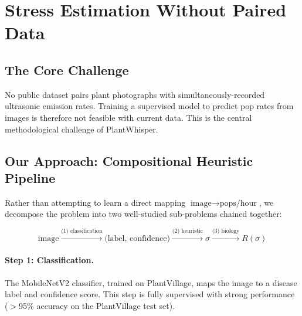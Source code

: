 \documentclass[11pt,a4paper,twocolumn]{article}
\begin{document}
\section{Stress Estimation Without Paired Data}
\label{sec:stress_mapping}

\subsection{The Core Challenge}

No public dataset pairs plant photographs with simultaneously-recorded ultrasonic emission rates. Training a supervised model to predict pop rates from images is therefore not feasible with current data. This is the central methodological challenge of PlantWhisper.

\subsection{Our Approach: Compositional Heuristic Pipeline}

Rather than attempting to learn a direct mapping $\text{image} \to \text{pops/hour}$, we decompose the problem into two well-studied sub-problems chained together:

\begin{equation}
    \text{image} \xrightarrow{\text{(1) classification}} \text{(label, confidence)} \xrightarrow{\text{(2) heuristic}} \sigma \xrightarrow{\text{(3) biology}} R(\sigma)
\end{equation}

\paragraph{Step 1: Classification.} The MobileNetV2 classifier, trained on PlantVillage, maps the image to a disease label and confidence score. This step is fully supervised with strong performance ($>$95\% accuracy on the PlantVillage test set).
\end{document}
